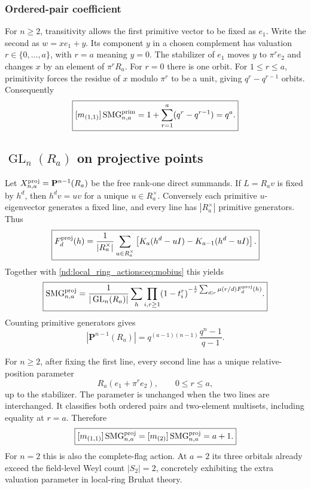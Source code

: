 \documentclass[10pt]{article}
\newcommand{\SMG}{\operatorname{SMG}}
\newcommand{\MGF}{\SMG}
\newcommand{\GL}{\operatorname{GL}}
\begin{document}
\subsubsection{Ordered-pair coefficient}
For $n\ge2$, transitivity allows the first primitive vector to be fixed as
$e_1$.  Write the second as $w=xe_1+y$.  Its component $y$ in a chosen
complement has valuation $r\in\{0,\ldots,a\}$, with $r=a$ meaning $y=0$.
The stabilizer of $e_1$ moves $y$ to $\pi^r e_2$ and changes $x$ by an
element of $\pi^rR_a$.  For $r=0$ there is one orbit.  For $1\le r\le a$,
primitivity forces the residue of $x$ modulo $\pi^r$ to be a unit, giving
$q^r-q^{r-1}$ orbits.  Consequently
\begin{equation}\label{nd:local_ring_actions:eq:primitive-pair}
 \boxed{[m_{(1,1)}]\MGF^{\rm prim}_{n,a}
 =1+\sum_{r=1}^a(q^r-q^{r-1})=q^a.}
\end{equation}

\subsection[GLn over Ra on projective points]{$\GL_n(R_a)$ on projective points}

Let $X^{\rm proj}_{n,a}=\mathbf P^{n-1}(R_a)$ be the free rank-one direct
summands.  If $L=R_av$ is fixed by $h^d$, then $h^dv=uv$ for a unique
$u\in R_a^\times$.  Conversely each primitive $u$-eigenvector generates a
fixed line, and every line has $|R_a^\times|$ primitive generators.  Thus
\begin{equation}\label{nd:local_ring_actions:eq:projective-fixed}
 \boxed{F_d^{\rm proj}(h)=\frac1{|R_a^\times|}\sum_{u\in R_a^\times}
 \left[K_a(h^d-uI)-K_{a-1}(h^d-uI)\right].}
\end{equation}
Together with \eqref{nd:local_ring_actions:eq:mobius} this yields
\begin{equation}\label{nd:local_ring_actions:eq:projective-smg}
 \boxed{\MGF^{\rm proj}_{n,a}=\frac1{|\GL_n(R_a)|}\sum_h
 \prod_{i,r\ge1}(1-t_i^r)^{-\frac1r\sum_{d\mid r}\mu(r/d)
 F_d^{\rm proj}(h)}.}
\end{equation}
Counting primitive generators gives
\[
 |\mathbf P^{n-1}(R_a)|
 =q^{(a-1)(n-1)}\frac{q^n-1}{q-1}.
\]

For $n\ge2$, after fixing the first line, every second line has a unique
relative-position parameter
\[
 R_a(e_1+\pi^r e_2),\qquad 0\le r\le a,
\]
up to the stabilizer.  The parameter is unchanged when the two lines are
interchanged.  It classifies both ordered pairs and two-element multisets,
including equality at $r=a$.  Therefore
\begin{equation}\label{nd:local_ring_actions:eq:projective-pair}
 \boxed{[m_{(1,1)}]\MGF^{\rm proj}_{n,a}
 =[m_{(2)}]\MGF^{\rm proj}_{n,a}=a+1.}
\end{equation}
For $n=2$ this is also the complete-flag action.  At $a=2$ its three
orbitals already exceed the field-level Weyl count $|S_2|=2$, concretely
exhibiting the extra valuation parameter in local-ring Bruhat theory.
\end{document}
